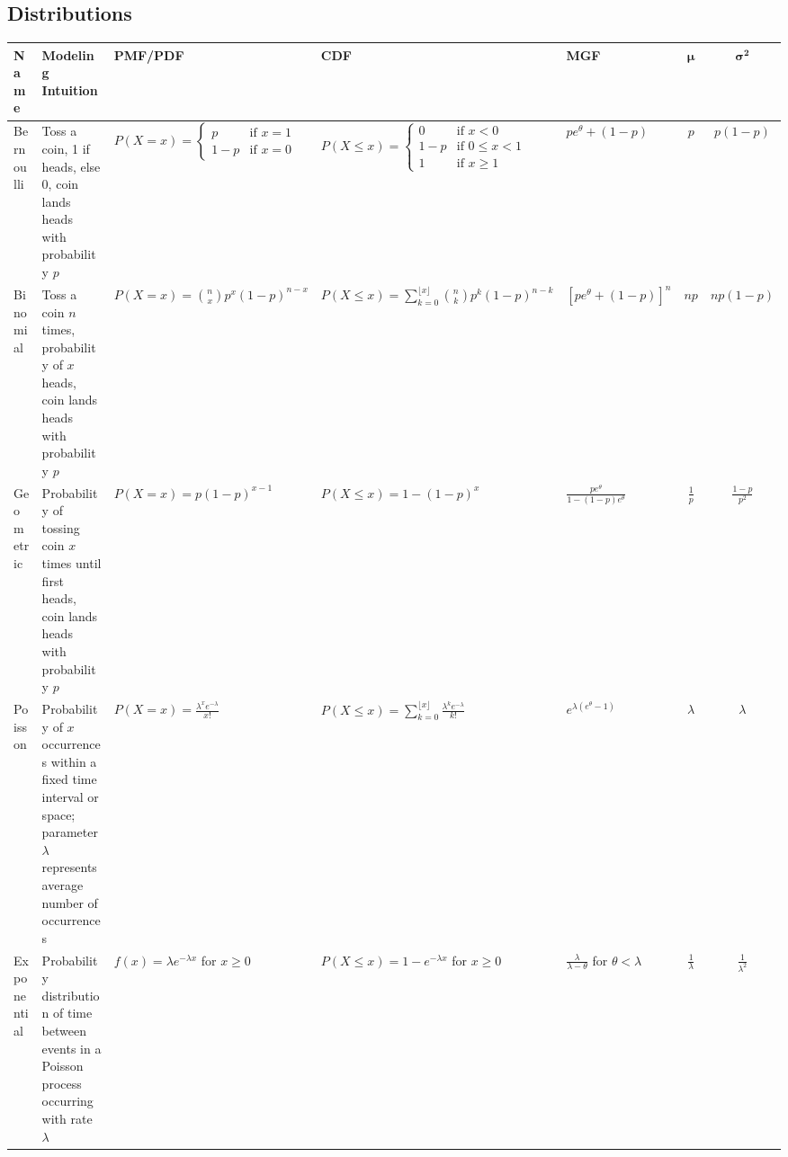 \documentclass{article}
\begin{document}
\subsection{Distributions}
\begin{table}[h]
\centering
\begin{tabular}{|l|p{3.5cm}|p{3.5cm}|p{3.5cm}|p{2.5cm}|c|c|}
\hline
\textbf{Name} & \textbf{Modeling Intuition} & \textbf{PMF/PDF} & \textbf{CDF} & \textbf{MGF} & $\boldsymbol{\mu}$ & $\boldsymbol{\sigma^2}$ \\
\hline
Bernoulli &
Toss a coin, 1 if heads, else 0, coin lands heads with probability $p$ &
$P(X = x) = \begin{cases}
p & \text{if } x = 1 \\
1-p & \text{if } x = 0
\end{cases}$ &
$P(X \leq x) = \begin{cases}
0 & \text{if } x < 0 \\
1-p & \text{if } 0 \leq x < 1 \\
1 & \text{if } x \geq 1
\end{cases}$ &
$pe^{\theta} + (1-p)$ &
$p$ &
$p(1-p)$ \\
\hline
Binomial &
Toss a coin $n$ times, probability of $x$ heads, coin lands heads with probability $p$ &
$P(X = x) = \binom{n}{x} p^x (1-p)^{n-x}$ &
$P(X \leq x) = \sum_{k=0}^{\lfloor x \rfloor} \binom{n}{k} p^k (1-p)^{n-k}$ &
$\left[ p e^{\theta} + (1-p) \right]^n$ &
$np$ &
$np(1-p)$ \\
\hline
Geometric &
Probability of tossing coin $x$ times until first heads, coin lands heads with probability $p$ &
$P(X = x) = p (1-p)^{x-1}$ &
$P(X \leq x) = 1 - (1-p)^x$ &
$\frac{p e^{\theta}}{1 - (1-p)e^{\theta}}$ &
$\frac{1}{p}$ &
$\frac{1-p}{p^2}$ \\
\hline
Poisson &
Probability of $x$ occurrences within a fixed time interval or space; parameter $\lambda$ represents average number of occurrences &
$P(X = x) = \frac{\lambda^x e^{-\lambda}}{x!}$ &
$P(X \leq x) = \sum_{k=0}^{\lfloor x \rfloor} \frac{\lambda^k e^{-\lambda}}{k!}$ &
$e^{\lambda (e^{\theta} - 1)}$ &
$\lambda$ &
$\lambda$ \\
\hline
Exponential &
Probability distribution of time between events in a Poisson process occurring with rate $\lambda$ &
$f(x) = \lambda e^{-\lambda x}$ for $x \geq 0$ &
$P(X \leq x) = 1 - e^{-\lambda x}$ for $x \geq 0$ &
$\frac{\lambda}{\lambda - \theta}$ for $\theta < \lambda$ &
$\frac{1}{\lambda}$ &
$\frac{1}{\lambda^2}$ \\

\end{tabular}
\end{table}
\end{document}
